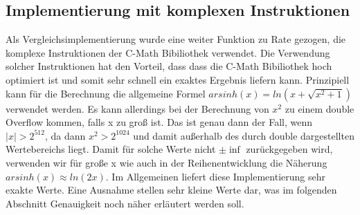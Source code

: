 \documentclass[course=erap] {aspdoc}
\begin{document}
 
 
     
 
     \subsection{Implementierung mit komplexen Instruktionen}
     
     Als Vergleichsimplementierung wurde eine weiter Funktion zu Rate gezogen, die komplexe Instruktionen der C-Math Bibiliothek verwendet. Die Verwendung solcher Instruktionen hat den Vorteil, dass dass die C-Math Bibiliothek hoch optimiert ist und somit sehr schnell ein exaktes Ergebnis liefern kann. Prinzipiell kann für die Berechnung die allgemeine Formel $ arsinh(x) = ln \left(x + \sqrt{x^2 + 1} \right)$ verwendet werden. Es kann allerdings bei der Berechnung von $x^2$ zu einem double Overflow kommen, falls x zu groß ist. Das ist genau dann der Fall, wenn $|x| > 2^{512}$, da dann $x^2 > 2^{1024}$ und damit außerhalb des durch double dargestellten Wertebereichs liegt. Damit für solche Werte nicht $\pm \inf$ zurückgegeben wird, verwenden wir für große x wie auch in der Reihenentwicklung die Näherung $arsinh(x)\approx ln(2x)$. Im Allgemeinen liefert diese Implementierung sehr exakte Werte. Eine Ausnahme stellen sehr kleine Werte dar, was im folgenden Abschnitt Genauigkeit noch näher erläutert werden soll.
 
\end{document}

